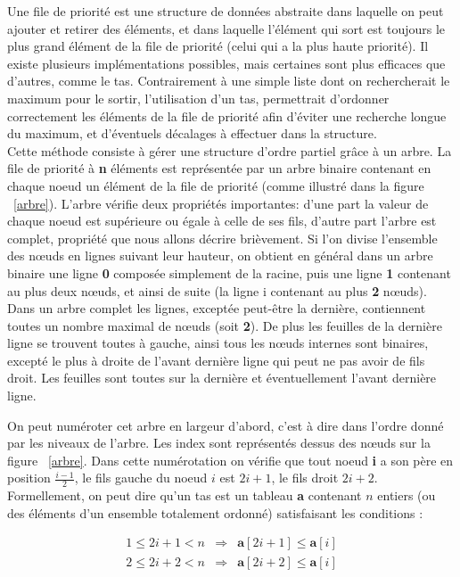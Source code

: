 \documentclass[iutinfo,a4paper,11pt]{ustl-tdtp}
\begin{document}
Une file de priorité est une structure de données abstraite dans
laquelle on peut ajouter et retirer des éléments, et dans laquelle
l'élément qui sort est toujours le plus grand élément de la file de
priorité 
(celui qui a la plus haute priorité).  
Il existe plusieurs implémentations possibles, mais certaines sont plus
efficaces que d'autres, comme le tas. Contrairement à une simple liste
dont on rechercherait le maximum pour le sortir, l'utilisation d'un
tas, permettrait d'ordonner correctement les éléments de la file de
priorité afin
d'éviter une recherche longue du maximum, et d'éventuels décalages à
effectuer dans la structure. 
\\
\newline
Cette méthode consiste à gérer une structure d'ordre partiel grâce à
un arbre. La file de priorité à \textbf{n} éléments est représentée par un arbre
binaire contenant en chaque noeud un élément de la file de priorité (comme
illustré dans la figure ~\ref{arbre}). L'arbre vérifie deux
propriétés importantes: d'une part la valeur de chaque noeud est
supérieure ou égale à celle de ses fils, d'autre part l'arbre est
complet, propriété que nous allons décrire brièvement. Si l'on divise
l'ensemble des n\oe uds en lignes suivant leur hauteur, on obtient en
général dans un arbre binaire une ligne \textbf{0} composée simplement
de la racine, puis une ligne \textbf{1} contenant au plus deux n\oe uds,
et ainsi de suite (la ligne i contenant au plus \textbf{2}
n\oe uds). Dans un arbre complet les lignes, exceptée peut-être la
dernière, contiennent toutes un nombre maximal de n\oe uds (soit
\textbf{2}). De plus les feuilles de la dernière ligne se
trouvent toutes à gauche, ainsi tous les n\oe uds internes sont binaires,
excepté le plus à droite de l'avant dernière ligne qui peut ne pas
avoir de fils droit. Les feuilles sont toutes sur la dernière et
éventuellement l'avant dernière ligne.  

On peut numéroter cet arbre en largeur d'abord, c'est à dire dans
l'ordre donné par les niveaux de l'arbre. Les index sont représentés
dessus des n\oe uds sur la figure
~\ref{arbre}. Dans cette numérotation on vérifie que tout noeud
\textbf{i} a son père en position $\frac{i-1}{2}$, le fils gauche du
noeud $i$ est $2i+1$, le fils droit
$2i+2$. Formellement, on peut dire qu'un tas est un tableau
\textbf{a} contenant $n$ entiers (ou des éléments d'un ensemble
totalement ordonné) satisfaisant les conditions : 

\begin{eqnarray*}
1 \leq 2i+1 < n & \Rightarrow & \mathbb{\textbf{a}}[2i+1] \leq 
                                 \mathbb{\textbf{a}}[i] \\
2 \leq 2i+2 < n & \Rightarrow & \mathbb{\textbf{a}}[2i+2] \leq 
                                 \mathbb{\textbf{a}}[i] \\
\end{eqnarray*}
\end{document}
